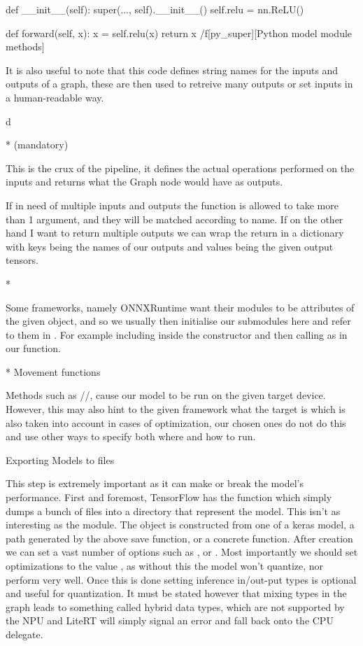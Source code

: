 \midinsert
\begtt {}
def __init__(self):
  super(..., self).__init__()
  self.relu = nn.ReLU()

def forward(self, x):
  x = self.relu(x)
  return x
\endtt
\caplabel/f[py_super][Python model module methods]
\endinsert

It is also useful to note that this code defines
string names for the inputs and outputs of a graph,
these are then used to retreive many outputs or set inputs
in a human-readable way.

\begitems \style d

* { (mandatory)}

This is the crux of the pipeline,
it defines the actual operations performed on
the inputs and returns what the Graph node would have
as outputs.

If in need of multiple inputs and outputs
the function is allowed to take more than 1 argument,
and they will be matched according to name.
If on the other hand I want to return
multiple outputs we can wrap
the return in a dictionary with keys
being the names of our outputs and values being
the given output tensors.

* {}

Some frameworks, namely ONNXRuntime want their modules
to be attributes of the given object,
and so we usually then initialise our submodules here and refer to them in .
For example including  inside the constructor
and then calling as  in our  function.

* {Movement functions}

Methods such as //,
cause our model to be run on the given target device.
However, this may also hint to the given framework
what the target is which is also taken into account
in cases of optimization,
our chosen ones do not do this and use other ways to specify both
where and how to run.

\enditems

\sec Exporting Models to files

This step is extremely important as it can make or break
the model's performance.
First and foremost, TensorFlow has the function
which simply dumps a bunch of files into a directory
that represent the model.
This isn't as interesting as the 
module.
The  object is constructed from
one of a keras model,
a  path generated by the above save function,
or a concrete function.
After creation we can set a vast number of options
such as , 
or .
Most importantly we should set optimizations to the value
,
as without this the model won't quantize,
nor perform very well.
Once this is done setting inference in/out-put types
is optional and useful for quantization.
It must be stated however that
mixing types in the graph leads to something called
hybrid data types,
which are not supported by the NPU
and LiteRT will simply signal an error
and fall back onto the CPU delegate.

